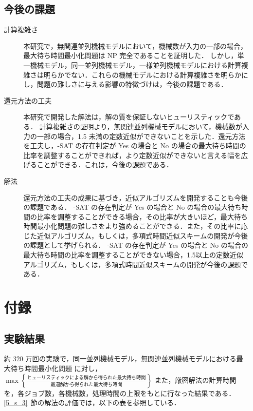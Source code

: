 \documentclass[12pt]{optlab-bachelor}
\begin{document}
\section{今後の課題}
\begin{description}
  \item[計算複雑さ ] 本研究で，無関連並列機械モデルにおいて，機械数が入力の一部の場合，最大待ち時間最小化問題は NP 完全であることを証明した．
  しかし，単一機械モデル，同一並列機械モデル，一様並列機械モデルにおける計算複雑さは明らかでない．これらの機械モデルにおける計算複雑さを明らかにし，問題の難しさに与える影響の特徴づけは，今後の課題である．

  \item[還元方法の工夫 ] 本研究で開発した解法は，解の質を保証しないヒューリスティックである．
  計算複雑さの証明より，無関連並列機械モデルにおいて，機械数が入力の一部の場合，1.5 未満の定数近似ができないことを示した．還元方法を工夫し，{-SAT} の存在判定が Yes の場合と No の場合の最大待ち時間の比率を調整することができれば，より定数近似ができないと言える幅を広げることができる．これは，今後の課題である．

  \item[解法 ]
  還元方法の工夫の成果に基づき，近似アルゴリズムを開発することも今後の課題である．
  {-SAT} の存在判定が Yes の場合と No の場合の最大待ち時間の比率を調整することができる場合，その比率が大きいほど，最大待ち時間最小化問題の難しさをより強めることができる．また，その比率に応じた近似アルゴリズム，もしくは，多項式時間近似スキームの開発が今後の課題として挙げられる．
  {-SAT} の存在判定が Yes の場合と No の場合の最大待ち時間の比率を調整することができない場合，1.5以上の定数近似アルゴリズム，もしくは，多項式時間近似スキームの開発が今後の課題である．

\end{description}

\chapter{付録}\label{c_7}
\section{実験結果}
約 320 万回の実験で，同一並列機械モデル，無関連並列機械モデルにおける最大待ち時間最小化問題 に対し，$\max \left\{ \frac{\text{ヒューリスティックによる解から得られた最大待ち時間}}{\text{最適解から得られた最大待ち時間}}\right\}$ また，厳密解法の計算時間を，各ジョブ数，各機械数，処理時間の上限をもとに行なった結果である．\ref{5_s_3}~節の解法の評価では，以下の表を参照している．
\end{document}

